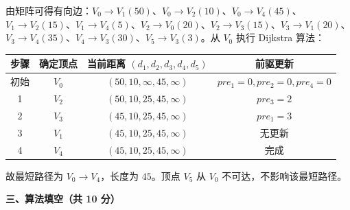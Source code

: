 \begin{question}[最短路径]
\begin{solution}
由矩阵可得有向边：$V_0\to V_1(50)$、$V_0\to V_2(10)$、$V_0\to V_4(45)$、$V_1\to V_2(15)$、$V_1\to V_4(5)$、$V_2\to V_0(20)$、$V_2\to V_3(15)$、$V_3\to V_1(20)$、$V_3\to V_4(35)$、$V_4\to V_3(30)$、$V_5\to V_3(3)$。从 $V_0$ 执行 Dijkstra 算法：
\begin{center}
\small
\begin{tabular}{c c c c}
\toprule
步骤 & 确定顶点 & 当前距离 $(d_1,d_2,d_3,d_4,d_5)$ & 前驱更新 \\
\midrule
初始 & $V_0$ & $(50,10,\infty,45,\infty)$ & $pre_1=0,pre_2=0,pre_4=0$ \\
1 & $V_2$ & $(50,10,25,45,\infty)$ & $pre_3=2$ \\
2 & $V_3$ & $(45,10,25,45,\infty)$ & $pre_1=3$ \\
3 & $V_1$ & $(45,10,25,45,\infty)$ & 无更新 \\
4 & $V_4$ & $(45,10,25,45,\infty)$ & 完成 \\
\bottomrule
\end{tabular}
\end{center}
故最短路径为 $V_0\to V_4$，长度为 $45$。顶点 $V_5$ 从 $V_0$ 不可达，不影响该最短路径。
\end{solution}
\end{question}

\clearpage

\textbf{三、算法填空（共 10 分）}



